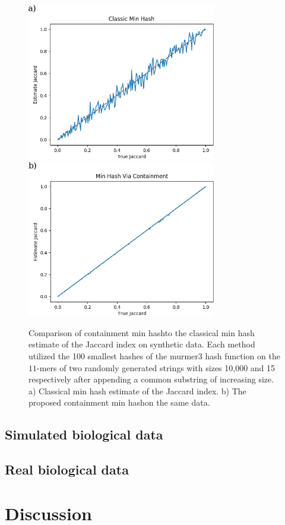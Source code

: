 \documentclass[11pt]{amsart}
\theoremstyle{remark}
\numberwithin{equation}{section}
\newcommand{\themethod}{containment min hash}
\begin{document}
\begin{figure}[!h]%
\begin{center}
\includegraphics[width=3.25in,trim={0 0 0 0in},clip]{Figs/TrueVsEstimate.png}%
\includegraphics[width=3.25in,trim={0 0 0 0in},clip]{Figs/ContainmentTrueVsEstimate.png}
\end{center}
\caption{Comparison of \themethod to the classical min hash estimate of the Jaccard index on synthetic data. Each method utilized the 100 smallest hashes of the murmer3 hash function on the $11$-mers of two randomly generated strings with sizes 10,000 and 15 respectively after appending a common substring of increasing size. a) Classical min hash estimate of the Jaccard index. b) The proposed \themethod on the same data.}
\label{fig:TrueVsEstimate}%
\end{figure}


\subsection{Simulated biological data}
\subsection{Real biological data}

\section{Discussion}


\clearpage
{}

\end{document}
